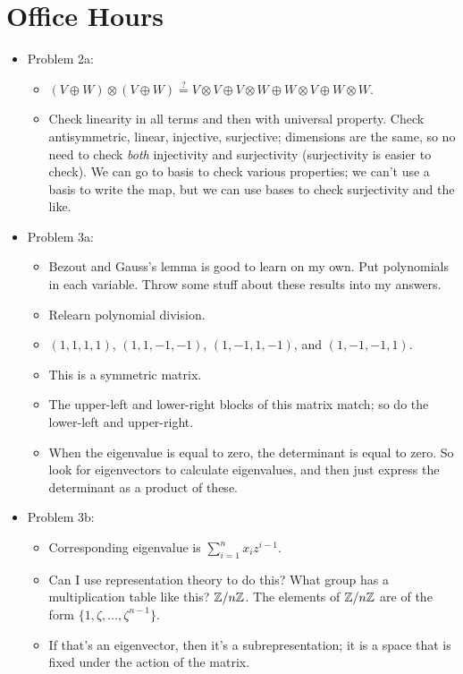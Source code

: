 \documentclass[../notes.tex]{subfiles}
\begin{document}
\section{Office Hours}
\begin{itemize}
    \item {}Problem 2a:
    \begin{itemize}
        \item $(V\oplus W)\otimes(V\oplus W)\stackrel{?}{=}V\otimes V\oplus V\otimes W\oplus W\otimes V\oplus W\otimes W$.
        \item Check linearity in all terms and then with universal property. Check antisymmetric, linear, injective, surjective; dimensions are the same, so no need to check \emph{both} injectivity and surjectivity (surjectivity is easier to check). We can go to basis to check various properties; we can't use a basis to write the map, but we can use bases to check surjectivity and the like.
    \end{itemize}
    \item Problem 3a:
    \begin{itemize}
        \item Bezout and Gauss's lemma is good to learn on my own. Put polynomials in each variable. Throw some stuff about these results into my answers.
        \item Relearn polynomial division.
        \item $(1,1,1,1)$, $(1,1,-1,-1)$, $(1,-1,1,-1)$, and $(1,-1,-1,1)$.
        \item This is a symmetric matrix.
        \item The upper-left and lower-right blocks of this matrix match; so do the lower-left and upper-right.
        \item When the eigenvalue is equal to zero, the determinant is equal to zero. So look for eigenvectors to calculate eigenvalues, and then just express the determinant as a product of these.
    \end{itemize}
    \item Problem 3b:
    \begin{itemize}
        \item Corresponding eigenvalue is $\sum_{i=1}^nx_iz^{i-1}$.
        \item Can I use representation theory to do this? What group has a multiplication table like this? $\mathbb{Z}/n\mathbb{Z}$. The elements of $\mathbb{Z}/n\mathbb{Z}$ are of the form $\{1,\zeta,\dots,\zeta^{n-1}\}$.
        \item If that's an eigenvector, then it's a subrepresentation; it is a space that is fixed under the action of the matrix.

\end{itemize}
\end{itemize}
\end{document}
